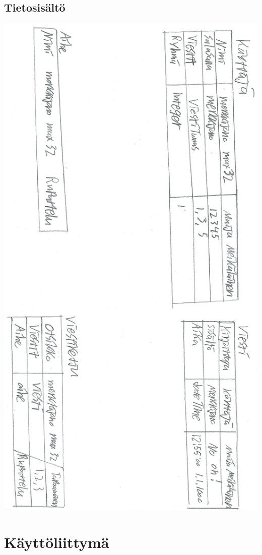 \documentclass[a4paper, 12pt, finnish]{article}
\begin{document}
\subsection{Tietosisältö}
\includegraphics[width=\textwidth,height=\textheight,keepaspectratio]{tietosisalto.png}

\section{Käyttöliittymä}
\end{document}
